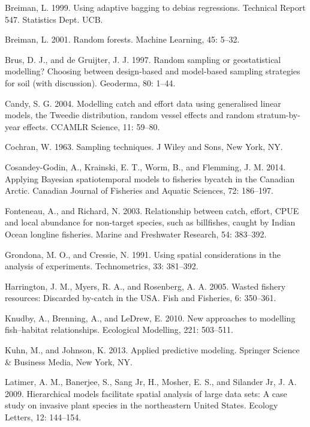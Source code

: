 \documentclass[]{article}
\begin{document}
\hypertarget{ref-breiman1999}{}
Breiman, L. 1999. Using adaptive bagging to debias regressions.
Technical Report 547. Statistics Dept. UCB.

\hypertarget{ref-breiman2001}{}
Breiman, L. 2001. Random forests. Machine Learning, 45: 5--32.

\hypertarget{ref-brus1997}{}
Brus, D. J., and de Gruijter, J. J. 1997. Random sampling or
geostatistical modelling? Choosing between design-based and model-based
sampling strategies for soil (with discussion). Geoderma, 80: 1--44.

\hypertarget{ref-candy2004}{}
Candy, S. G. 2004. Modelling catch and effort data using generalised
linear models, the Tweedie distribution, random vessel effects and
random stratum-by-year effects. CCAMLR Science, 11: 59--80.

\hypertarget{ref-cochran1963}{}
Cochran, W. 1963. Sampling techniques. J Wiley and Sons, New York, NY.

\hypertarget{ref-cosandey-godin2014}{}
Cosandey-Godin, A., Krainski, E. T., Worm, B., and Flemming, J. M. 2014.
Applying Bayesian spatiotemporal models to fisheries bycatch in the
Canadian Arctic. Canadian Journal of Fisheries and Aquatic Sciences, 72:
186--197.

\hypertarget{ref-fonteneau2003}{}
Fonteneau, A., and Richard, N. 2003. Relationship between catch, effort,
CPUE and local abundance for non-target species, such as billfishes,
caught by Indian Ocean longline fisheries. Marine and Freshwater
Research, 54: 383--392.

\hypertarget{ref-grondona1991}{}
Grondona, M. O., and Cressie, N. 1991. Using spatial considerations in
the analysis of experiments. Technometrics, 33: 381--392.

\hypertarget{ref-harrington2005}{}
Harrington, J. M., Myers, R. A., and Rosenberg, A. A. 2005. Wasted
fishery resources: Discarded by-catch in the USA. Fish and Fisheries, 6:
350--361.

\hypertarget{ref-knudby2010}{}
Knudby, A., Brenning, A., and LeDrew, E. 2010. New approaches to
modelling fish--habitat relationships. Ecological Modelling, 221:
503--511.

\hypertarget{ref-kuhn2013}{}
Kuhn, M., and Johnson, K. 2013. Applied predictive modeling. Springer
Science \& Business Media, New York, NY.

\hypertarget{ref-latimer2009}{}
Latimer, A. M., Banerjee, S., Sang Jr, H., Mosher, E. S., and Silander
Jr, J. A. 2009. Hierarchical models facilitate spatial analysis of large
data sets: A case study on invasive plant species in the northeastern
United States. Ecology Letters, 12: 144--154.
\end{document}
